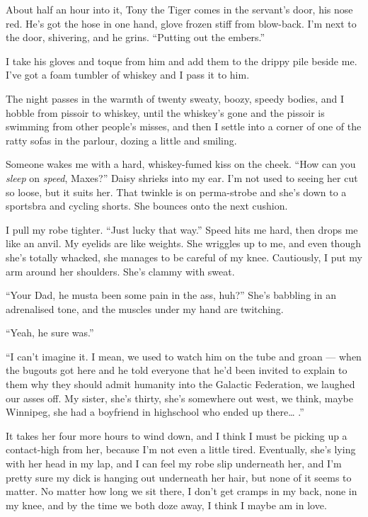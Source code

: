 About half an hour into it, Tony the Tiger comes in the servant's
door, his nose red. He's got the hose in one hand, glove frozen
stiff from blow-back. I'm next to the door, shivering, and he
grins. ``Putting out the embers.''

I take his gloves and toque from him and add them to the drippy
pile beside me. I've got a foam tumbler of whiskey and I pass it to
him.

The night passes in the warmth of twenty sweaty, boozy, speedy
bodies, and I hobble from pissoir to whiskey, until the whiskey's
gone and the pissoir is swimming from other people's misses, and
then I settle into a corner of one of the ratty sofas in the
parlour, dozing a little and smiling.

Someone wakes me with a hard, whiskey-fumed kiss on the cheek.
``How can you \emph{sleep} on \emph{speed}, Maxes?'' Daisy shrieks
into my ear. I'm not used to seeing her cut so loose, but it suits
her. That twinkle is on perma-strobe and she's down to a sportsbra
and cycling shorts. She bounces onto the next cushion.

I pull my robe tighter. ``Just lucky that way.'' Speed hits me
hard, then drops me like an anvil. My eyelids are like weights. She
wriggles up to me, and even though she's totally whacked, she
manages to be careful of my knee. Cautiously, I put my arm around
her shoulders. She's clammy with sweat.

``Your Dad, he musta been some pain in the ass, huh?'' She's
babbling in an adrenalised tone, and the muscles under my hand are
twitching.

``Yeah, he sure was.''

``I can't imagine it. I mean, we used to watch him on the tube and groan --- 
when the bugouts got here and he told everyone that he'd been invited to 
explain to them why they should admit humanity into the Galactic Federation, we 
laughed our asses off. My sister, she's thirty, she's somewhere out west, we 
think, maybe Winnipeg, she had a boyfriend in highschool who ended up 
there\ldots{} .''

It takes her four more hours to wind down, and I think I must be
picking up a contact-high from her, because I'm not even a little
tired. Eventually, she's lying with her head in my lap, and I can
feel my robe slip underneath her, and I'm pretty sure my dick is
hanging out underneath her hair, but none of it seems to matter. No
matter how long we sit there, I don't get cramps in my back, none
in my knee, and by the time we both doze away, I think I maybe am
in love.

